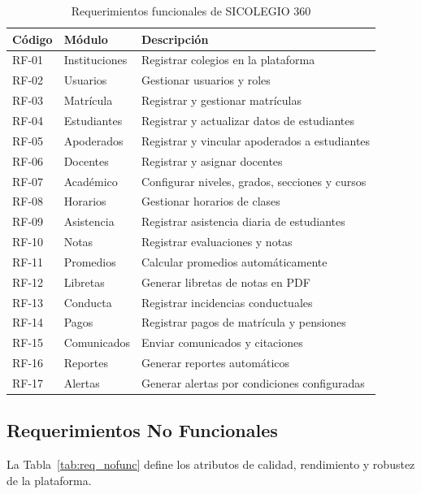 \documentclass[12pt,a4paper,oneside]{report}
\begin{document}
\begin{table}[H]
\centering
\caption{Requerimientos funcionales de SICOLEGIO 360}
\label{tab:req_func}
\begin{tabularx}{\textwidth}{llX}
\toprule
Código & Módulo & Descripción \\
\midrule
RF-01 & Instituciones & Registrar colegios en la plataforma \\
RF-02 & Usuarios & Gestionar usuarios y roles \\
RF-03 & Matrícula & Registrar y gestionar matrículas \\
RF-04 & Estudiantes & Registrar y actualizar datos de estudiantes \\
RF-05 & Apoderados & Registrar y vincular apoderados a estudiantes \\
RF-06 & Docentes & Registrar y asignar docentes \\
RF-07 & Académico & Configurar niveles, grados, secciones y cursos \\
RF-08 & Horarios & Gestionar horarios de clases \\
RF-09 & Asistencia & Registrar asistencia diaria de estudiantes \\
RF-10 & Notas & Registrar evaluaciones y notas \\
RF-11 & Promedios & Calcular promedios automáticamente \\
RF-12 & Libretas & Generar libretas de notas en PDF \\
RF-13 & Conducta & Registrar incidencias conductuales \\
RF-14 & Pagos & Registrar pagos de matrícula y pensiones \\
RF-15 & Comunicados & Enviar comunicados y citaciones \\
RF-16 & Reportes & Generar reportes automáticos \\
RF-17 & Alertas & Generar alertas por condiciones configuradas \\
\bottomrule
\end{tabularx}
\end{table}

\subsection{Requerimientos No Funcionales}
La Tabla~\ref{tab:req_nofunc} define los atributos de calidad, rendimiento y robustez de la plataforma.
\end{document}
